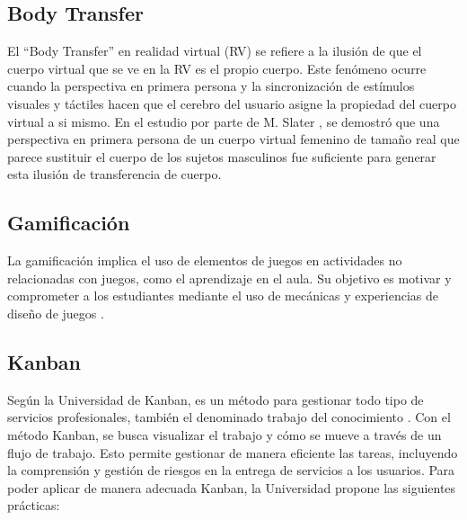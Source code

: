 \subsection{Body Transfer}

El ``Body Transfer'' en realidad virtual (RV) se refiere a la ilusión de que el cuerpo virtual que se ve en la RV 
es el propio cuerpo. Este fenómeno ocurre cuando la perspectiva en primera persona y la sincronización de estímulos 
visuales y táctiles hacen que el cerebro del usuario asigne la propiedad del cuerpo virtual a si mismo. En el estudio 
por parte de M. Slater \cite{11}, se demostró que una perspectiva en primera persona de un cuerpo virtual 
femenino de tamaño real que parece sustituir el cuerpo de los sujetos masculinos fue suficiente para generar esta 
ilusión de transferencia de cuerpo.

\subsection{Gamificación}

La gamificación implica el uso de elementos de juegos en actividades no relacionadas con juegos, como el aprendizaje 
en el aula. Su objetivo es motivar y comprometer a los estudiantes mediante el uso de mecánicas y experiencias de 
diseño de juegos \cite{12}.

\subsection{Kanban}

Según la Universidad de Kanban, es un método para gestionar todo tipo de servicios profesionales, también el 
denominado trabajo del conocimiento \cite{17}. Con el método Kanban, se busca visualizar el trabajo y 
cómo se mueve a través de un flujo de trabajo. Esto permite gestionar de manera eficiente las tareas, incluyendo
 la comprensión y gestión de riesgos en la entrega de servicios a los usuarios. Para poder aplicar de manera adecuada Kanban, 
 la Universidad propone las siguientes prácticas:

